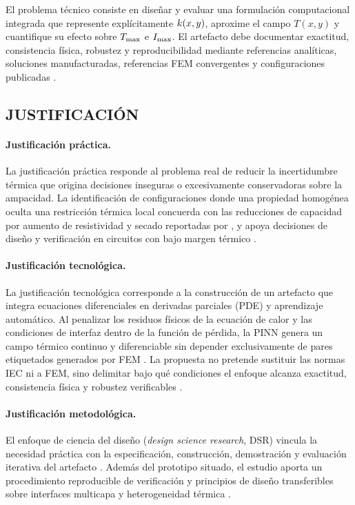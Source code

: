 El problema técnico consiste en diseñar y evaluar una formulación computacional integrada que represente explícitamente $k(x,y)$, aproxime el campo $T(x,y)$ y cuantifique su efecto sobre $T_{\max}$ e $I_{\max}$. El artefacto debe documentar exactitud, consistencia física, robustez y reproducibilidad mediante referencias analíticas, soluciones manufacturadas, referencias FEM convergentes y configuraciones publicadas \parencites{iec60287}{iec60853}[3--4,93--99]{cigre2025}[686--690]{raissi2019}.

\subsection{JUSTIFICACIÓN}

\paragraph{Justificación práctica.}
La justificación práctica responde al problema real de reducir la incertidumbre térmica que origina decisiones inseguras o excesivamente conservadoras sobre la ampacidad. La identificación de configuraciones donde una propiedad homogénea oculta una restricción térmica local concuerda con las reducciones de capacidad por aumento de resistividad y secado reportadas por \textcite[1,6--9]{khumalo2025}, y apoya decisiones de diseño y verificación en circuitos con bajo margen térmico \parencite[14842,14851]{fariz2026}.

\paragraph{Justificación tecnológica.}
La justificación tecnológica corresponde a la construcción de un artefacto que integra ecuaciones diferenciales en derivadas parciales (PDE) y aprendizaje automático. Al penalizar los residuos físicos de la ecuación de calor y las condiciones de interfaz dentro de la función de pérdida, la PINN genera un campo térmico continuo y diferenciable sin depender exclusivamente de pares etiquetados generados por FEM \parencites[686--690]{raissi2019}[1--3,12]{aldulaimi2024}. La propuesta no pretende sustituir las normas IEC ni a FEM, sino delimitar bajo qué condiciones el enfoque alcanza exactitud, consistencia física y robustez verificables \parencite[93--99]{cigre2025}.

\paragraph{Justificación metodológica.}
El enfoque de ciencia del diseño (\textit{design science research}, DSR) vincula la necesidad práctica con la especificación, construcción, demostración y evaluación iterativa del artefacto \parencite[55--56]{peffers2007}. Además del prototipo situado, el estudio aporta un procedimiento reproducible de verificación y principios de diseño transferibles sobre interfaces multicapa y heterogeneidad térmica \parencite[342--350]{gregor2013}.

